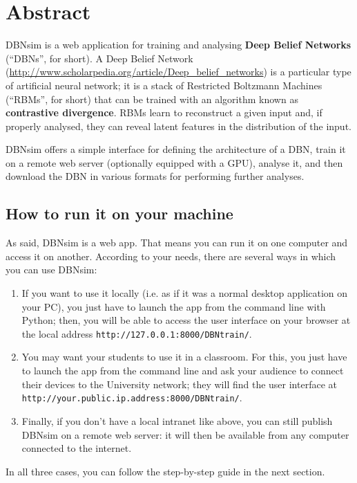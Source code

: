 \section{Abstract}

DBNsim is a web application for training and analysing \textbf{Deep Belief Networks} (``DBNs'', for short). A Deep Belief Network (\url{http://www.scholarpedia.org/article/Deep_belief_networks}) is a particular type of artificial neural network; it is a stack of Restricted Boltzmann Machines (``RBMs'', for short) that can be trained with an algorithm known as \textbf{contrastive divergence}. RBMs learn to reconstruct a given input and, if properly analysed, they can reveal latent features in the distribution of the input.

DBNsim offers a simple interface for defining the architecture of a DBN, train it on a remote web server (optionally equipped with a GPU), analyse it, and then download the DBN in various formats for performing further analyses.


\subsection{How to run it on your machine}

As said, DBNsim is a web app. That means you can run it on one computer and access it on another. According to your needs, there are several ways in which you can use DBNsim:
\begin{enumerate}
	\item If you want to use it locally (i.e. as if it was a normal desktop application on your PC), you just have to launch the app from the command line with Python; then, you will be able to access the user interface on your browser at the local address \texttt{http://127.0.0.1:8000/DBNtrain/}.
	\item You may want your students to use it in a classroom. For this, you just have to launch the app from the command line and ask your audience to connect their devices to the University network; they will find the user interface at \texttt{http://your.public.ip.address:8000/DBNtrain/}.
	\item Finally, if you don't have a local intranet like above, you can still publish DBNsim on a remote web server: it will then be available from any computer connected to the internet.
\end{enumerate}

In all three cases, you can follow the step-by-step guide in the next section.

